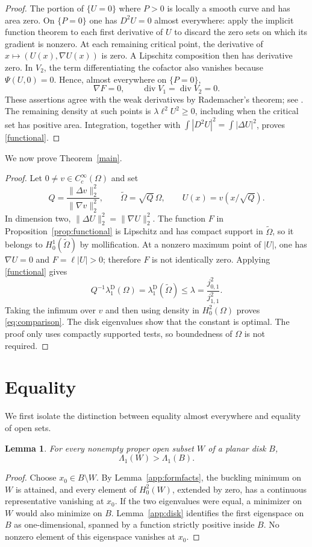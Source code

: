 \documentclass[11pt]{article}
\newtheorem{lemma}[theorem]{Lemma}
\theoremstyle{remark}
\begin{document}
\begin{proof}
The portion of $\{U=0\}$ where $P>0$ is locally a smooth curve and
has area zero. On $\{P=0\}$ one has $D^2U=0$ almost everywhere:
apply the implicit function theorem to each first derivative of
$U$ to discard the zero sets on which its gradient is nonzero.
At each remaining critical point, the derivative of
$x\mapsto(U(x),\nabla U(x))$ is zero. A Lipschitz composition then
has derivative zero. In $V_2$, the term differentiating the cofactor
also vanishes because $\Psi(U,0)=0$. Hence, almost everywhere on
$\{P=0\}$,
\[
 \nabla F=0,\qquad \operatorname{div}V_1
       =\operatorname{div}V_2=0.
\]
These assertions agree with the weak derivatives by Rademacher's
theorem; see \cite[\S\S3.1, 4.2]{EG}. The remaining density at
such points is $\lambda\ell^2U^2\ge0$, including when the critical
set has positive area. Integration, together with
$\int|D^2U|^2=\int|\Delta U|^2$, proves \eqref{functional}.
\end{proof}

We now prove Theorem~\ref{main}.
\begin{proof}
Let $0\ne v\in C_c^\infty(\Omega)$ and set
\[
 Q=\frac{\|\Delta v\|_2^2}{\|\nabla v\|_2^2},\qquad
 \widetilde\Omega=\sqrt Q\,\Omega,\qquad U(x)=v(x/\sqrt Q).
\]
In dimension two, $\|\Delta U\|_2^2=\|\nabla U\|_2^2$.
The function $F$ in Proposition~\ref{prop:functional} is Lipschitz
and has compact support in $\widetilde\Omega$, so it belongs to
$H_0^1(\widetilde\Omega)$ by mollification. At a nonzero maximum
point of $|U|$, one has $\nabla U=0$ and $F=\ell|U|>0$; therefore
$F$ is not identically zero. Applying \eqref{functional} gives
\[
 Q^{-1}\lambda_1^{\mathrm D}(\Omega)
   =\lambda_1^{\mathrm D}(\widetilde\Omega)
   \le\lambda=\frac{j_{0,1}^2}{j_{1,1}^2}.
\]
Taking the infimum over $v$ and then using density in $H_0^2(\Omega)$
proves \eqref{eq:comparison}. The disk eigenvalues show that the
constant is optimal. The proof only uses compactly supported tests,
so boundedness of $\Omega$ is not required.
\end{proof}

\section{Equality}\label{sec:equality}
We first isolate the distinction between equality almost everywhere
and equality of open sets.
\begin{lemma}\label{lem:strict-disk}
For every nonempty proper open subset $W$ of a planar disk $B$,
\[
 \Lambda_1(W)>\Lambda_1(B).
\]
\end{lemma}
\begin{proof}
Choose $x_0\in B\setminus W$. By Lemma~\ref{app:formfacts}, the
buckling minimum on $W$ is attained, and every element of $H_0^2(W)$,
extended by zero, has a continuous representative vanishing at $x_0$.
If the two eigenvalues were equal, a minimizer on $W$ would also
minimize on $B$. Lemma~\ref{app:disk} identifies the first eigenspace
on $B$ as one-dimensional, spanned by a function strictly positive
inside $B$. No nonzero element of this eigenspace vanishes at $x_0$.
\end{proof}
\end{document}
